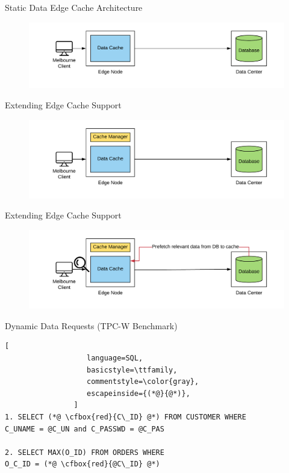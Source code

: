 \documentclass[12pt]{beamer}
\newcommand{\cfbox}[2]{%
    \colorlet{currentcolor}{.}%
    {\color{#1}%
    \fbox{\color{currentcolor}#2}}%
}
\begin{document}
\begin{frame}{Static Data Edge Cache Architecture}
    \begin{figure}
        \center
        \hspace*{-1.5cm}
        \includegraphics[scale=0.17]{apollo_ec_dbl_0}
    \end{figure}
\end{frame}

\begin{frame}{Extending Edge Cache Support}
    \begin{figure}
        \center
        \hspace*{-1.5cm}
        \includegraphics[scale=0.17]{apollo_ec_dbl}
    \end{figure}
\end{frame}

\begin{frame}{Extending Edge Cache Support}
    \begin{figure}
        \center
        \hspace*{-1.5cm}
        \includegraphics[scale=0.17]{apollo_ec_dbl_learn}
    \end{figure}
\end{frame}

\begin{frame}[fragile]{Dynamic Data Requests (TPC-W Benchmark)}
    \begin{lstlisting}[
                   language=SQL,
                   basicstyle=\ttfamily,
                   commentstyle=\color{gray},
                   escapeinside={(*@}{@*)},
                ]
1. SELECT (*@ \cfbox{red}{C\_ID} @*) FROM CUSTOMER WHERE 
C_UNAME = @C_UN and C_PASSWD = @C_PAS

2. SELECT MAX(O_ID) FROM ORDERS WHERE
O_C_ID = (*@ \cfbox{red}{@C\_ID} @*)
    \end{lstlisting}

\begin{center}
\end{center}
\end{frame}
\end{document}
